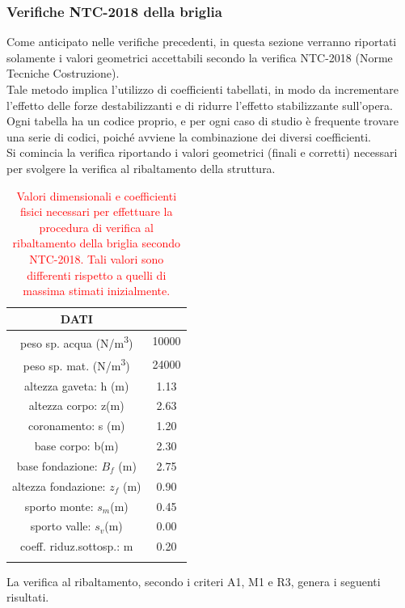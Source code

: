 \subsubsection{Verifiche NTC-2018 della briglia}
Come anticipato nelle verifiche precedenti, in questa sezione verranno riportati solamente i valori geometrici accettabili secondo la verifica NTC-2018 (Norme Tecniche Costruzione).\\
Tale metodo implica l'utilizzo di coefficienti tabellati, in modo da incrementare l'effetto delle forze destabilizzanti e di ridurre l'effetto stabilizzante sull'opera. Ogni tabella ha un codice proprio, e per ogni caso di studio è frequente trovare una serie di codici, poiché avviene la combinazione dei diversi coefficienti.\\
Si comincia la verifica riportando i valori geometrici (finali e corretti) necessari per svolgere la verifica al ribaltamento della struttura.
\begin{table}[H] \centering
    \caption{\textcolor{red}{Valori dimensionali e coefficienti fisici necessari per effettuare la procedura di verifica al ribaltamento della briglia secondo NTC-2018. Tali valori sono differenti rispetto a quelli di massima stimati inizialmente.}}
    \begin{tabular}{cc}
    \toprule    
        DATI & \\
    \bottomrule
    peso sp. acqua (\unit{N/m^3})      & 10000 \\
    peso sp. mat. (\unit{N/m^3})  & 24000 \\
    altezza gaveta: h (m)      & 1.13  \\
    altezza corpo: z(m)        & 2.63  \\
    coronamento: s (m)         & 1.20  \\
    base corpo: b(m)           & 2.30  \\
    base fondazione: $B_f$ (m)    & 2.75  \\
    altezza fondazione: $z_f$ (m) & 0.90  \\
    sporto monte: $s_m$(m)         & 0.45  \\
    sporto valle: $s_v$(m)        & 0.00  \\
    coeff. riduz.sottosp.: m   & 0.20  \\
    \bottomrule
    \label{valori_dimensionali_NTC2018}
    \end{tabular}
\end{table}
La verifica al ribaltamento, secondo i criteri A1, M1 e R3, genera i seguenti risultati.

